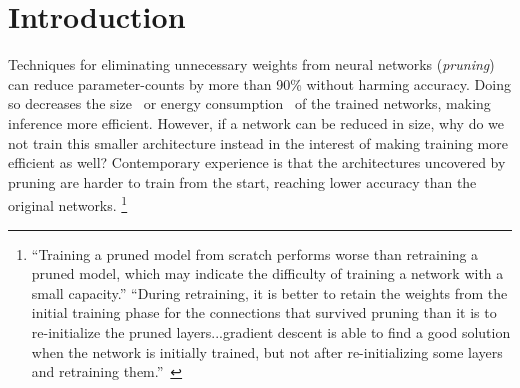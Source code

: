\section{Introduction}
\label{sec:intro}

Techniques for eliminating unnecessary weights from neural networks
(\emph{pruning})~\citep{brain-damage, brain-surgeon, han-pruning, pruning-filters}
can reduce parameter-counts by more than 90\% without harming accuracy. Doing so
decreases the size~\citep{han-pruning, distilling} or energy consumption~\citep{prune-energy, pruning-resource-efficient, thinet}
of the trained networks, making inference more efficient.
However, if a network can be reduced in size, why do we not train this smaller architecture instead in the interest of making training more efficient as well?
Contemporary experience is that the architectures uncovered by pruning are harder to train from the start, reaching lower
accuracy than the original networks.%
\footnote{``Training a pruned model from scratch performs worse than retraining a pruned model, which may
indicate the difficulty of training a network with a small capacity.'' \citep{pruning-filters} ``During retraining, it is better to retain
the weights from the initial training phase for the connections
that survived pruning than it is to re-initialize the pruned layers...gradient descent is able to find a good solution when the network is initially trained,
but not after re-initializing some layers and retraining them.''~\citep{han-pruning}}


